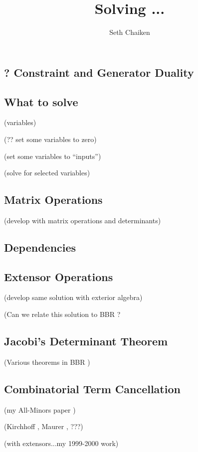 \documentclass{article}
\title{Solving ... }
\author{Seth Chaiken}
\begin{document}
\maketitle
\subsection{? Constraint and Generator Duality}


\subsection{What to solve}

(variables) ~\cite{OMBOOK}

(?? set some variables to zero)

(set some variables to ``inputs'')

(solve for selected variables) 

\subsection{Matrix Operations}

(develop with matrix operations and determinants)

\subsection{Dependencies}
\subsection{Extensor Operations}

(develop same solution with exterior algebra)

(Can we relate this solution to BBR \cite{exteriorCalc}?


\subsection{Jacobi's Determinant Theorem}

(Various theorems in 
BBR \cite{exteriorCalc})

\subsection{Combinatorial Term Cancellation}

(my All-Minors paper \cite{sdcMTT} )

(Kirchhoff \cite{Kirchhoff}, Maurer \cite{Maurer76}, ???)

(with extensors...my 1999-2000 work)

{}

\end{document}
